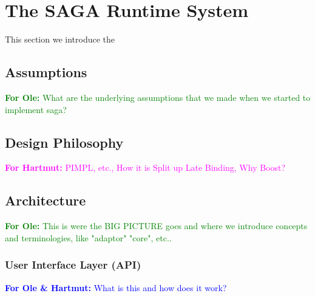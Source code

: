 \section{The SAGA Runtime System}

\newcommand{\forhartmut}[1]{{\textcolor{magenta}{\textbf{For Hartmut:} #1 }}}
\newcommand{\forole}[1]{{\textcolor{green}{\textbf{For Ole:} #1 }}}
\newcommand{\foroleandhartmut}[1]{{\textcolor{blue}{\textbf{For Ole \& Hartmut:} #1 }}}

  This section we introduce the 

  \subsection{Assumptions} 
  \forole{What are the underlying assumptions that we made when we started to
  implement saga?}


  \subsection{Design Philosophy}
  \forhartmut{ PIMPL, etc., How it is Split up Late Binding, Why Boost?}


  \subsection{Architecture}
  
  \forole{This is were the BIG PICTURE goes and where we introduce concepts and
  terminologies, like "adaptor" "core", etc..}


  \subsubsection{User Interface Layer (API)}
  \foroleandhartmut{What is this and how does it work?}
 
 
